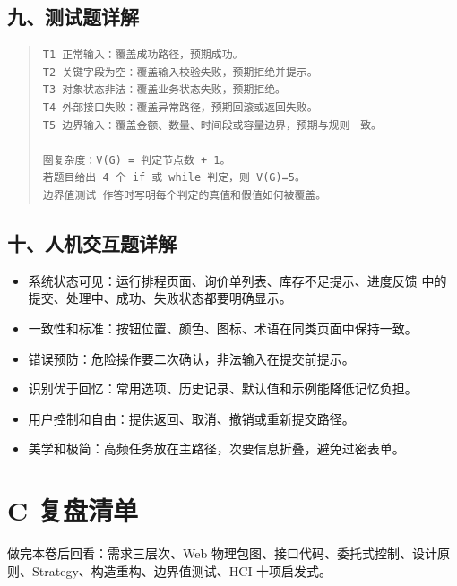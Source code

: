 \documentclass[UTF8,zihao=-4]{ctexart}
\begin{document}
\subsection{九、测试题详解}


\begin{quote}
\footnotesize
\begin{verbatim}
T1 正常输入：覆盖成功路径，预期成功。
T2 关键字段为空：覆盖输入校验失败，预期拒绝并提示。
T3 对象状态非法：覆盖业务状态失败，预期拒绝。
T4 外部接口失败：覆盖异常路径，预期回滚或返回失败。
T5 边界输入：覆盖金额、数量、时间段或容量边界，预期与规则一致。

圈复杂度：V(G) = 判定节点数 + 1。
若题目给出 4 个 if 或 while 判定，则 V(G)=5。
边界值测试 作答时写明每个判定的真值和假值如何被覆盖。
\end{verbatim}
\end{quote}



\subsection{十、人机交互题详解}


\begin{itemize}
\item 系统状态可见：运行排程页面、询价单列表、库存不足提示、进度反馈 中的提交、处理中、成功、失败状态都要明确显示。
\item 一致性和标准：按钮位置、颜色、图标、术语在同类页面中保持一致。
\item 错误预防：危险操作要二次确认，非法输入在提交前提示。
\item 识别优于回忆：常用选项、历史记录、默认值和示例能降低记忆负担。
\item 用户控制和自由：提供返回、取消、撤销或重新提交路径。
\item 美学和极简：高频任务放在主路径，次要信息折叠，避免过密表单。
\end{itemize}



\section{C 复盘清单}


做完本卷后回看：需求三层次、Web 物理包图、接口代码、委托式控制、设计原则、Strategy、构造重构、边界值测试、HCI 十项启发式。
\end{document}
